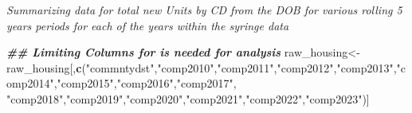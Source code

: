 \documentclass[
]{article}
\newenvironment{Shaded}{\begin{snugshade}}{\end{snugshade}}
\newcommand{\DocumentationTok}[1]{\textcolor[rgb]{0.56,0.35,0.01}{\textbf{\textit{#1}}}}
\newcommand{\FunctionTok}[1]{\textcolor[rgb]{0.13,0.29,0.53}{\textbf{#1}}}
\newcommand{\NormalTok}[1]{#1}
\newcommand{\OtherTok}[1]{\textcolor[rgb]{0.56,0.35,0.01}{#1}}
\newcommand{\StringTok}[1]{\textcolor[rgb]{0.31,0.60,0.02}{#1}}
\begin{document}
\emph{Summarizing data for total new Units by CD from the DOB for
various rolling 5 years periods for each of the years within the syringe
data}

\begin{Shaded}
\begin{Highlighting}[]
\DocumentationTok{\#\# Limiting Columns for is needed for analysis}
\NormalTok{raw\_housing}\OtherTok{\textless{}{-}}\NormalTok{raw\_housing[,}\FunctionTok{c}\NormalTok{(}\StringTok{"commntydst"}\NormalTok{,}\StringTok{"comp2010"}\NormalTok{,}\StringTok{"comp2011"}\NormalTok{,}\StringTok{"comp2012"}\NormalTok{,}\StringTok{"comp2013"}\NormalTok{,}\StringTok{"comp2014"}\NormalTok{,}\StringTok{"comp2015"}\NormalTok{,}\StringTok{"comp2016"}\NormalTok{,}\StringTok{"comp2017"}\NormalTok{,}
               \StringTok{"comp2018"}\NormalTok{,}\StringTok{"comp2019"}\NormalTok{,}\StringTok{"comp2020"}\NormalTok{,}\StringTok{"comp2021"}\NormalTok{,}\StringTok{"comp2022"}\NormalTok{,}\StringTok{"comp2023"}\NormalTok{)]}


\end{Highlighting}
\end{Shaded}
\end{document}
